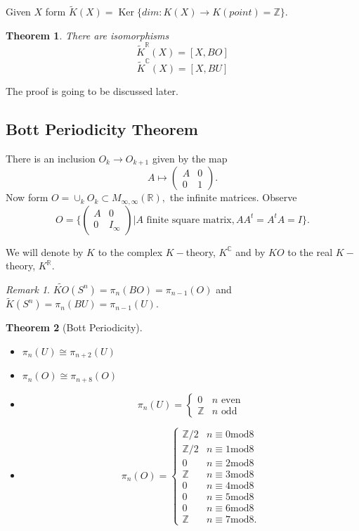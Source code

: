\documentclass[a4paper,10pt]{article}
\theoremstyle{plain}%
\newtheorem{thm}{Theorem}
\theoremstyle{definition}
\theoremstyle{remark}
\newtheorem{rem}{Remark}
\newcommand{\ZZ}{\mathbb{Z}}
\newcommand{\RR}{\mathbb{R}}
\newcommand{\CC}{\mathbb{C}}
\DeclareMathOperator{\Ker}{Ker}
\begin{document}
Given $X$ form $\tilde{K}(X) = \Ker\{dim:K(X)\to K(point) = \ZZ\}.$

\begin{thm}
There are isomorphisms
\[
\tilde{K}^\RR(X) = [X, BO]
\]
\[
\tilde{K}^\CC(X) = [X, BU]
\]
\end{thm}

The proof is going to be discussed later.

\subsection{Bott Periodicity Theorem}

There is an inclusion $O_k\to O_{k+1}$ given by the map
\[A\mapsto \left( 
\begin{array}{cc}
A & 0 \\
0 & 1 
\end{array} \right).\] 
Now form $O = \cup_k O_k\subset M_{\infty,\infty}(\RR),$ the infinite matrices. Observe 
\[O=\bigg\{\left( 
\begin{array}{cc}
A & 0 \\
0 & I_\infty 
\end{array} \right) \bigg| A \text{ finite square matrix}, AA^t = A^tA = I\bigg\}.\] 

We will denote by $K$ to the complex $K-$theory, $K^\CC$ and by $KO$ to the real $K-$theory, $K^\RR.$
\begin{rem}
$\tilde{KO}(S^n) = \pi_n (BO)= \pi_{n-1} (O)$ and
$\tilde{K}(S^n) = \pi_n (BU)= \pi_{n-1} (U).$
\end{rem}

\begin{thm}[Bott Periodicity]
\begin{itemize}
\item $\pi_n(U) \cong \pi_{n+2}(U)$
\item $\pi_n(O) \cong \pi_{n+8}(O)$
\item \[ \pi_n(U) = \begin{cases} 0 & n\text{ even}\\
\ZZ & n\text{ odd}
\end{cases}
\]
\item \[ \pi_n(O) = 
\begin{cases} 
\ZZ / 2 & n\equiv 0\text{mod}8\\
\ZZ / 2 & n\equiv 1\text{mod}8\\
0       & n\equiv 2\text{mod}8\\
\ZZ     & n\equiv 3\text{mod}8\\
0       & n\equiv 4\text{mod}8\\
0       & n\equiv 5\text{mod}8\\
0       & n\equiv 6\text{mod}8\\
\ZZ     & n\equiv 7\text{mod}8.
\end{cases}
\]
\end{itemize}
\end{thm}
\end{document}
